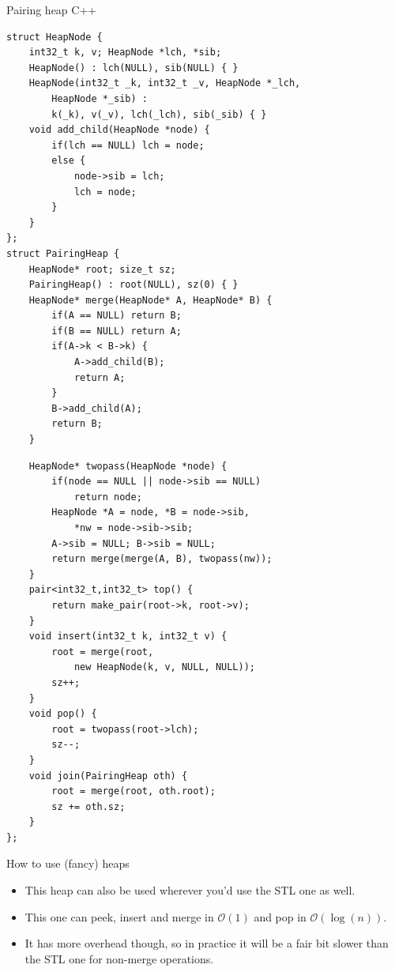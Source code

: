 \documentclass{beamer}
\begin{document}
\begin{frame}{Pairing heap C++}
    \tiny
    \begin{multicols}{2}
    \begin{verbatim}
struct HeapNode {
    int32_t k, v; HeapNode *lch, *sib;
    HeapNode() : lch(NULL), sib(NULL) { }
    HeapNode(int32_t _k, int32_t _v, HeapNode *_lch, 
        HeapNode *_sib) :
        k(_k), v(_v), lch(_lch), sib(_sib) { }
    void add_child(HeapNode *node) {
        if(lch == NULL) lch = node;
        else {
            node->sib = lch;
            lch = node;
        }
    }
};
struct PairingHeap {
    HeapNode* root; size_t sz;
    PairingHeap() : root(NULL), sz(0) { }
    HeapNode* merge(HeapNode* A, HeapNode* B) {
        if(A == NULL) return B;
        if(B == NULL) return A;
        if(A->k < B->k) {
            A->add_child(B);
            return A;
        }
        B->add_child(A);
        return B;
    }
    \end{verbatim}
    \columnbreak
    \begin{verbatim}
    HeapNode* twopass(HeapNode *node) {
        if(node == NULL || node->sib == NULL) 
            return node;
        HeapNode *A = node, *B = node->sib, 
            *nw = node->sib->sib;
        A->sib = NULL; B->sib = NULL;
        return merge(merge(A, B), twopass(nw));
    }
    pair<int32_t,int32_t> top() {
        return make_pair(root->k, root->v);
    }
    void insert(int32_t k, int32_t v) {
        root = merge(root, 
            new HeapNode(k, v, NULL, NULL));
        sz++;
    }
    void pop() {
        root = twopass(root->lch);
        sz--;
    }
    void join(PairingHeap oth) {
        root = merge(root, oth.root);
        sz += oth.sz;
    }
};
    \end{verbatim}
    \end{multicols}
\end{frame}

\begin{frame}[plain]{How to use (fancy) heaps}
    \begin{itemize}
        \item This heap can also be used wherever you'd use the STL one as well.
        \item This one can peek, insert and merge in $\mathcal{O}(1)$ and pop in $\mathcal{O}(\log(n))$.
        \item It has more overhead though, so in practice it will be a fair bit slower than the STL one for non-merge operations.
    \end{itemize}
\end{frame}
\end{document}
